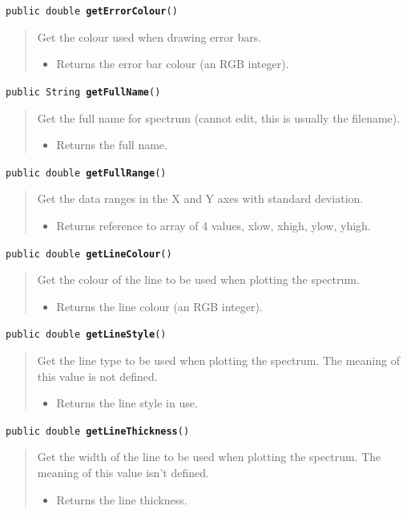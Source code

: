 \documentclass[twoside,11pt]{article}
\renewcommand{\_}{\texttt{\symbol{95}}}
\newcommand{\method}[1]{\texttt{#1}}
\newenvironment{desc}{\begin{quote}}{\end{quote}}
\begin{document}
\method{public double \textbf{getErrorColour}()\label{l51}\label{l52}}
\begin{desc}Get the colour used when drawing error bars.
\begin{itemize}
\item{Returns the error bar colour (an RGB integer). }
\end{itemize}
\end{desc}

\method{public String \textbf{getFullName}()\label{l53}\label{l54}}
\begin{desc}Get the full name for spectrum (cannot edit, this is usually
 the filename).
\begin{itemize}
\item{Returns the full name. }
\end{itemize}
\end{desc}

\method{public double \textbf{getFullRange}()\label{l55}\label{l56}}
\begin{desc}Get the data ranges in the X and Y axes with standard
 deviation.
\begin{itemize}
\item{Returns reference to array of 4 values, xlow, xhigh, ylow, yhigh. }
\end{itemize}
\end{desc}

\method{public double \textbf{getLineColour}()\label{l57}\label{l58}}
\begin{desc}Get the colour of the line to be used when plotting the
 spectrum.
\begin{itemize}
\item{Returns the line colour (an RGB integer). }
\end{itemize}
\end{desc}

\method{public double \textbf{getLineStyle}()\label{l59}\label{l60}}
\begin{desc}Get the line type to be used when plotting the spectrum.
 The meaning of this value is not defined.
\begin{itemize}
\item{Returns the line style in use. }
\end{itemize}
\end{desc}

\method{public double \textbf{getLineThickness}()\label{l61}\label{l62}}
\begin{desc}Get the width of the line to be used when plotting the
 spectrum. The meaning of this value isn't defined.
\begin{itemize}
\item{Returns the line thickness. }
\end{itemize}
\end{desc}
\end{document}
